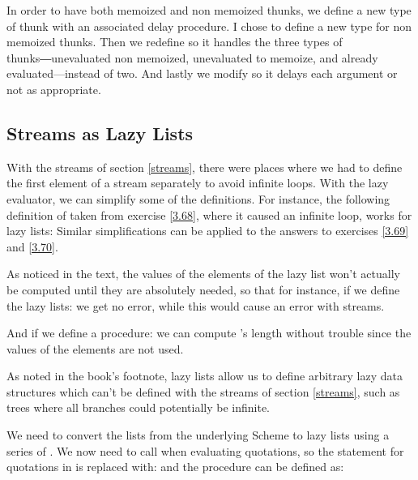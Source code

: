 \begin{exe}[4.31]
    In order to have both memoized and non memoized thunks, we define a new type 
    of thunk with an associated delay procedure. I chose to define a new type 
    for non memoized thunks. Then we redefine  so it handles the 
    three types of thunks―unevaluated non memoized, unevaluated to memoize, and 
    already evaluated—instead of two. And lastly we modify  so it 
    delays each argument or not as appropriate.
\end{exe}

\subsection{Streams as Lazy Lists}

\begin{exe}[4.32]
    With the streams of section \ref{streams}, there were places where we had to 
    define the first element of a stream separately to avoid infinite loops. 
    With the lazy evaluator, we can simplify some of the definitions. For 
    instance, the following definition of  taken from exercise 
    \ref{3.68}, where it caused an infinite loop, works for lazy lists:
    Similar simplifications can be applied to the answers to exercises 
    \ref{3.69} and \ref{3.70}.

    \medskip

    As noticed in the text, the values of the elements of the lazy list won’t 
    actually be computed until they are absolutely needed, so that for instance, 
    if we define the lazy lists:
    we get no error, while this would cause an error with streams.

    \medskip

    And if we define a  procedure:
    we can compute ’s length without trouble since the values of the 
    elements are not used.

    \medskip

    As noted in the book’s footnote, lazy lists allow us to define arbitrary 
    lazy data structures which can’t be defined with the streams of section 
    \ref{streams}, such as trees where all branches could potentially be 
    infinite.
\end{exe}

\begin{exe}[4.33]
    We need to convert the lists from the underlying Scheme to lazy lists using 
    a series of . We now need to call  when evaluating 
    quotations, so the statement for quotations in  is replaced with:
    and the  procedure can be defined as:
\end{exe}

